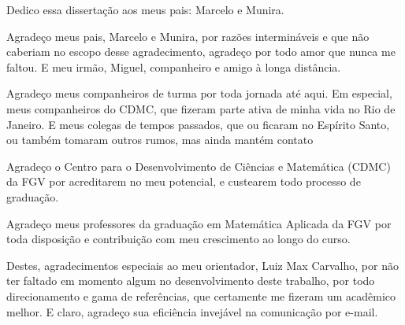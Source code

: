 \begin{dedicatoria}
    \vspace*{\fill}
    \hfill
    \begin{minipage}{.6\textwidth}
     Dedico essa dissertação aos meus pais: Marcelo e Munira. 
    \end{minipage}
\end{dedicatoria}
 
\begin{agradecimentos}

    Agradeço meus pais, Marcelo e Munira, por razões intermináveis e que não caberiam no escopo desse agradecimento, agradeço por todo amor que nunca me faltou. E meu irmão, Miguel, companheiro e amigo à longa distância. 
    
    Agradeço meus companheiros de turma por toda jornada até aqui. Em especial, meus companheiros do CDMC, que fizeram parte ativa de minha vida no Rio de Janeiro. E meus colegas de tempos passados, que ou ficaram no Espírito Santo, ou também tomaram outros rumos, mas ainda mantém contato
    
    Agradeço o Centro para o Desenvolvimento de Ciências e Matemática (CDMC) da FGV por acreditarem no meu potencial, e custearem todo processo de graduação.
    
    Agradeço meus professores da graduação em Matemática Aplicada da FGV por toda disposição e contribuição com meu crescimento ao longo do curso. 
    
    Destes, agradecimentos especiais ao meu orientador, Luiz Max Carvalho, por não ter faltado em momento algum no desenvolvimento deste trabalho, por todo direcionamento e gama de referências, que certamente me fizeram um acadêmico melhor. E claro, agradeço sua eficiência invejável na comunicação por e-mail.
    
    
    
    
    

\end{agradecimentos}

